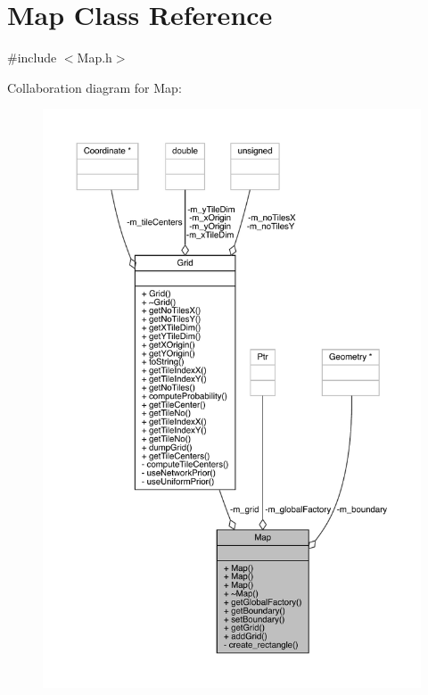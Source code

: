 \hypertarget{class_map}{}\section{Map Class Reference}
\label{class_map}


{\ttfamily \#include $<$Map.\+h$>$}



Collaboration diagram for Map\+:
\nopagebreak
\begin{figure}[H]
\begin{center}
\leavevmode
\includegraphics[width=350pt]{class_map__coll__graph}
\end{center}
\end{figure}
